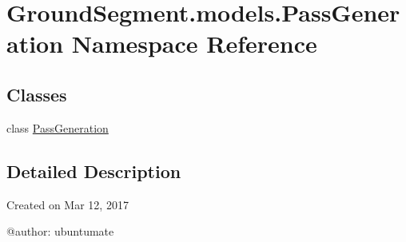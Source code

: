 \hypertarget{namespace_ground_segment_1_1models_1_1_pass_generation}{}\section{Ground\+Segment.\+models.\+Pass\+Generation Namespace Reference}
\label{namespace_ground_segment_1_1models_1_1_pass_generation}
\subsection*{Classes}
\begin{DoxyCompactItemize}
\item 
class \hyperlink{class_ground_segment_1_1models_1_1_pass_generation_1_1_pass_generation}{Pass\+Generation}
\end{DoxyCompactItemize}


\subsection{Detailed Description}
\begin{DoxyVerb}Created on Mar 12, 2017

@author: ubuntumate
\end{DoxyVerb}
 